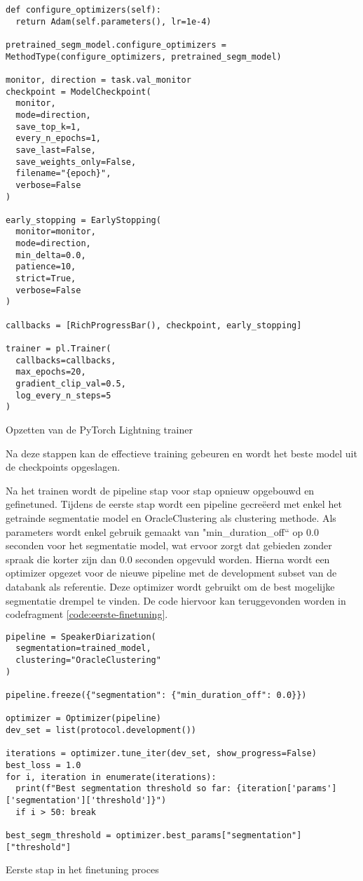 \begin{listing}
	\begin{verbatim}
def configure_optimizers(self):
  return Adam(self.parameters(), lr=1e-4)
  
pretrained_segm_model.configure_optimizers = MethodType(configure_optimizers, pretrained_segm_model)

monitor, direction = task.val_monitor
checkpoint = ModelCheckpoint(
  monitor,
  mode=direction,
  save_top_k=1,
  every_n_epochs=1,
  save_last=False,
  save_weights_only=False,
  filename="{epoch}",
  verbose=False
)

early_stopping = EarlyStopping(
  monitor=monitor,
  mode=direction,
  min_delta=0.0,
  patience=10,
  strict=True,
  verbose=False
)

callbacks = [RichProgressBar(), checkpoint, early_stopping]

trainer = pl.Trainer(
  callbacks=callbacks,
  max_epochs=20,
  gradient_clip_val=0.5,
  log_every_n_steps=5
)
	\end{verbatim}
	\caption[PyTorch Lightning set-up]{\label{code:pl-setup}Opzetten van de PyTorch Lightning trainer}
\end{listing}

Na deze stappen kan de effectieve training gebeuren en wordt het beste model uit de checkpoints opgeslagen.

Na het trainen wordt de pipeline stap voor stap opnieuw opgebouwd en gefinetuned. Tijdens de eerste stap wordt een pipeline gecreëerd met enkel het getrainde segmentatie model en OracleClustering als clustering methode. Als parameters wordt enkel gebruik gemaakt van "min\_duration\_off`` op 0.0 seconden voor het segmentatie model, wat ervoor zorgt dat gebieden zonder spraak die korter zijn dan 0.0 seconden opgevuld worden. Hierna wordt een optimizer opgezet voor de nieuwe pipeline met de development subset van de databank als referentie. Deze optimizer wordt gebruikt om de best mogelijke segmentatie drempel te vinden. De code hiervoor kan teruggevonden worden in codefragment \ref{code:eerste-finetuning}.

\begin{listing}
	\begin{verbatim}
pipeline = SpeakerDiarization(
  segmentation=trained_model,
  clustering="OracleClustering"
)

pipeline.freeze({"segmentation": {"min_duration_off": 0.0}})

optimizer = Optimizer(pipeline)
dev_set = list(protocol.development())

iterations = optimizer.tune_iter(dev_set, show_progress=False)
best_loss = 1.0
for i, iteration in enumerate(iterations):
  print(f"Best segmentation threshold so far: {iteration['params']['segmentation']['threshold']}")
  if i > 50: break
  
best_segm_threshold = optimizer.best_params["segmentation"]["threshold"]
	\end{verbatim}
	\caption[Set-up voor eerste finetuning]{\label{code:eerste-finetuning}Eerste stap in het finetuning proces}
\end{listing}

